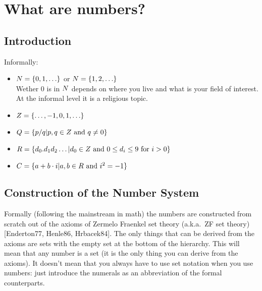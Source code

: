 

\section{What are numbers?}

\subsection{Introduction}

Informally:
\begin{itemize}
\item $N = \{0,1,\ldots\}$ or $N = \{1,2,\ldots\}$ \\
      Wether $0$ is in $N$ depends on where you live and what is your field
      of interest. At the informal level it is a religious topic.
\item $Z = \{\ldots,-1,0,1,\ldots\}$
\item $Q = \{p/q | p, q \in Z \mbox{ and } q \neq 0\}$
\item $R = \{d_0.d_1d_2\ldots | d_0 \in Z \mbox{ and } 0 \leq d_i \leq 9
      \mbox{ for } i>0\}$
\item $C = \{a+b \cdot i | a, b \in R \mbox{ and } i^2 = -1\}$
\end{itemize}

\subsection{Construction of the Number System}

Formally (following the mainstream in math) the numbers are constructed
from scratch out of the axioms of Zermelo Fraenkel set theory (a.k.a.\ ZF set
theory) [Enderton77, Henle86, Hrbacek84]. The only things that can be derived
from the axioms are sets with the empty set at the bottom of the hierarchy.
This will mean that any number is a set (it is the only thing you can derive
from the axioms). It doesn't mean that you always have to use set notation
when you use numbers: just introduce the numerals as an abbreviation of the
formal counterparts.

